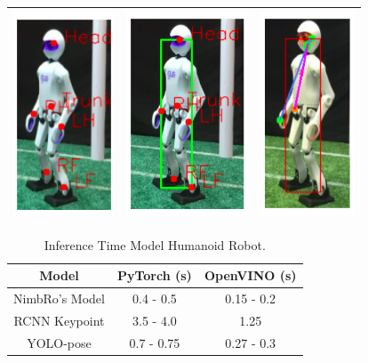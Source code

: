 \begin{longtable}{|c|c|c|}
  \includegraphics{gambar/nimbro-3.png} & \includegraphics{gambar/rcnn-3.png} & \includegraphics{gambar/yolo-3.png} \\
  \hline
\end{longtable}

\begin{longtable}{|c|c|c|}
  \caption{Inference Time Model Humanoid Robot.}
  \label{tb:inferencerobot}\\
  \hline
  \rowcolor[HTML]{C0C0C0}
  \textbf{Model}    & \textbf{PyTorch (s)} & \textbf{OpenVINO (s)}\\
  \hline
  NimbRo's Model & 0.4 - 0.5 & 0.15 - 0.2 \\
  \hline
  RCNN Keypoint  & 3.5 - 4.0 & 1.25 \\
  \hline
  YOLO-pose      & 0.7 - 0.75& 0.27 - 0.3 \\
  \hline
\end{longtable}


